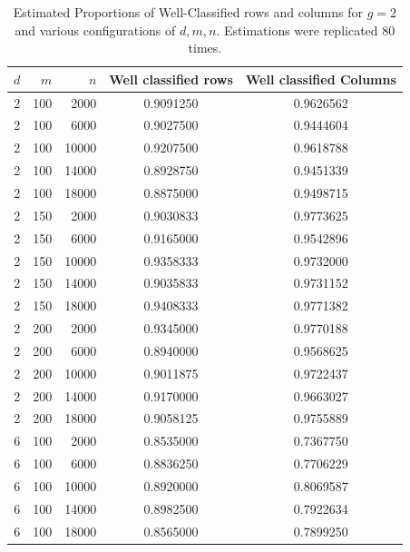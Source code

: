 \documentclass[a4paper]{article}
\begin{document}
\begin{table}[!htb]
    \centering
\begin{tabular}{|r|r|r|c|c|}
\hline
$d$ & $m$ & $n$  & Well classified rows & Well classified Columns \\
\hline
 2 &100 & 2000 & 0.9091250 & 0.9626562\\
 2 &100 & 6000 & 0.9027500 & 0.9444604\\
 2 &100 &10000 & 0.9207500  & 0.9618788\\
 2 &100 &14000 & 0.8928750 & 0.9451339\\
 2 &100 &18000 & 0.8875000 & 0.9498715\\
\hline
 2 &150 & 2000 & 0.9030833 &  0.9773625 \\
 2 &150 & 6000 & 0.9165000 &  0.9542896\\
 2 &150 &10000 & 0.9358333 & 0.9732000\\
 2 &150 &14000 & 0.9035833 & 0.9731152\\
 2 &150 &18000 & 0.9408333 &  0.9771382\\
\hline
 2 &200 & 2000 & 0.9345000 & 0.9770188\\
 2 &200 & 6000 & 0.8940000 & 0.9568625\\
 2 &200 &10000 & 0.9011875 & 0.9722437\\
 2 &200 &14000 & 0.9170000 & 0.9663027\\
 2 &200 &18000 & 0.9058125 & 0.9755889\\
\hline
 6 &100 & 2000 & 0.8535000 & 0.7367750\\
 6 &100 & 6000 & 0.8836250 &  0.7706229\\
 6 &100 &10000 & 0.8920000 & 0.8069587 \\
 6 &100 &14000 & 0.8982500 & 0.7922634\\
 6 &100 &18000 & 0.8565000         & 0.7899250\\
\hline
    \end{tabular}
    \caption{Estimated Proportions of Well-Classified rows and columns for $g=2$ and various configurations of $d,m,n$. Estimations
    were replicated 80 times.}
    \label{tab:classif}
\end{table}
  

\end{document}
